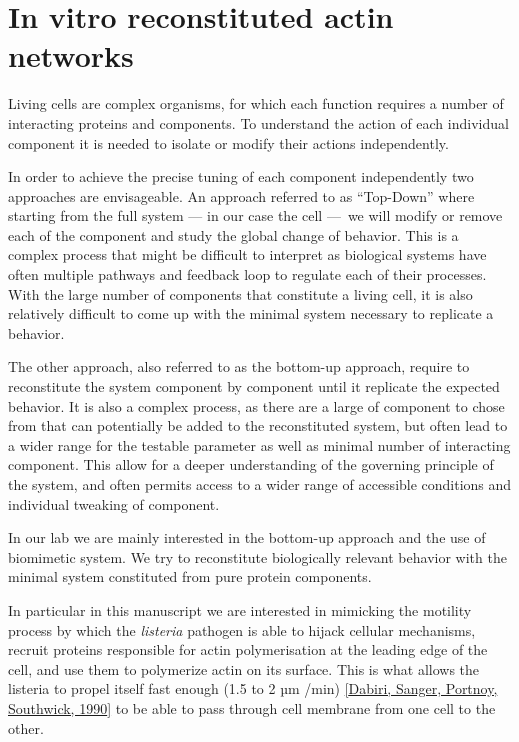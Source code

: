 \documentclass[A4paperpaper,11pt,english]{sphinxmanual}
\begin{document}
\section{In vitro reconstituted actin networks}
\label{parts/part1:in-vitro-reconstituted-actin-networks}
Living cells are complex organisms, for which each function requires a number
of interacting proteins and components. To understand the action of each
individual component it is needed to isolate or modify their actions
independently.

In order to achieve the  precise tuning of each component independently two
approaches are envisageable. An approach referred to  as ``Top-Down'' where
starting from the full system — in our case the cell — we will modify or remove
each of the component and study the global change of behavior. This is a complex
process that might be difficult to interpret as biological systems have often
multiple pathways and feedback loop to regulate each of their processes. With the
large number of components that constitute a living cell, it is also relatively
difficult to come up with the minimal system necessary to replicate a behavior.

The other approach, also referred to as the  bottom-up approach, require to
reconstitute the system  component by component until it replicate the expected
behavior. It is also a complex process, as there are a large of component to
chose from that can potentially be added to the reconstituted system, but often
lead to a wider range for the testable parameter as well as minimal number of
interacting component. This allow for a deeper understanding of the governing
principle of the system, and often permits access to a wider range of accessible
conditions and individual tweaking of component.

In our lab we are mainly interested in the bottom-up approach and the use of
biomimetic system. We try to reconstitute biologically relevant behavior with
the minimal system constituted from pure protein components.

In particular in this manuscript we are interested in mimicking the motility process
by which the \emph{listeria} pathogen is able to hijack cellular mechanisms, recruit proteins
responsible for actin polymerisation at the leading edge of the cell, and use
them to polymerize actin on its surface. This is what allows the listeria to
propel itself fast enough (1.5 to 2 µm /min) {\hyperref[parts/part1:dabiri1990]{{[}Dabiri, Sanger, Portnoy, Southwick,  1990{]}}} to be able to
pass through cell membrane from one cell to the other.
\end{document}
